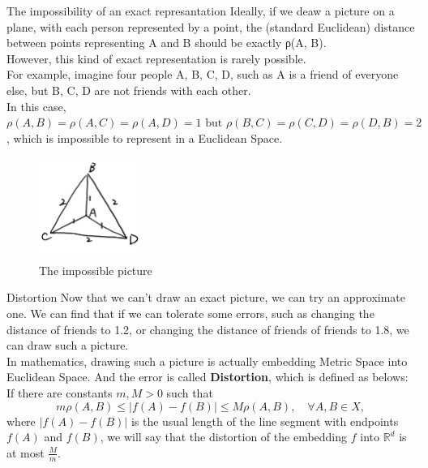 \documentclass[xcolor=dvipsnames]{beamer}
\theoremstyle{remark}
\begin{document}
\begin{frame}{The impossibility of an exact represantation}
  \hspace*{1em}Ideally, if we deaw a picture on a plane, with each person represented by a point, the (standard Euclidean) distance between points representing A and B should be exactly ρ(A, B).\\
  \hspace*{1em}However, this kind of exact representation is rarely possible.\\
  \hspace*{1em}For example, imagine four people A, B, C, D, such as A is a friend of everyone else, but B, C, D are not friends with each other.\\
  \hspace*{1em}In this case, $\rho(A, B) = \rho(A, C) = \rho(A, D) = 1 \text{ but } \rho(B, C) = \rho(C, D) = \rho(D, B) = 2$, which is impossible to represent in a Euclidean Space.\\
  \begin{figure}[H] %
    \centering       %
    \includegraphics[width=0.3\textwidth]{fig3.jpg} %
    \caption{The impossible picture} %
    \label{Fig3}   %
\end{figure}
\end{frame}

\begin{frame}{Distortion}
  \hspace*{1em}Now that we can't draw an exact picture, we can try an approximate one. We can find that if we can tolerate some errors, such as changing the distance of friends to 1.2, or changing the distance of friends of friends to 1.8, we can draw such a picture.\\
  \hspace*{1em}In mathematics, drawing such a picture is actually embedding Metric Space into Euclidean Space. And the error is called \textbf{Distortion}, which is defined as belows: \\
  \hspace*{1em}If there are constants \( m, M > 0 \) such that
  \[
  m \rho(A, B) \leq | f(A) - f(B) | \leq M \rho(A, B), \quad \forall A, B \in X,
  \]
  where \( | f(A) - f(B) | \) is the usual length of the line segment with endpoints \( f(A) \) and \( f(B) \), we will say that the distortion of the embedding \( f \) into \( \mathbb{R}^d \) is at most \( \frac{M}{m} \).\\
\end{frame}
\end{document}

